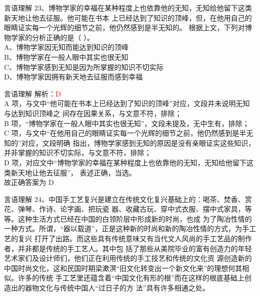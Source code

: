 \documentclass[aspectratio=169]{beamer}
\begin{document}
\begin{frame}[t]{言语理解}
    23、博物学家的幸福在某种程度上也依靠他的无知，无知给他留下这类新天地让他去征服。他可能在书本
    上已经达到了知识的顶峰，但，在他用自己的眼睛证实每一个光辉的细节之前，他仍然感到是半无知的。
    根据上文，下列对博物学家的分析正确的是（ ）。\\
    A、博物学家因无知而能达到知识的顶峰\\
    B、博物学家在一般人眼中其实也很无知\\
    C、博物学家感到无知是因为所掌握的知识不切实际\\
    D、博物学家因拥有新天地去征服而感到幸福\\
\end{frame}




\begin{frame}[t]{言语理解}
    解析：\textcolor{red}{D}\\
    A 项，与文中“他可能在书本上已经达到了知识的顶峰”对应，文段并未说明无知与达到知识顶峰之
    间存在因果关系，与文意不符，排除；\\
    B 项，“博物学家在一般人眼中其实也很无知”，文段未提及，无中生有，排除；\\
    C 项，与文中“在他用自己的眼睛证实每一个光辉的细节之前，他仍然感到是半无知的”对应，文段明确
    指出，博物学家感到无知的原因是没有亲眼证实这些知识，并非掌握的知识不切实际，与文意不符，排除；\\
    D 项，对应文中“博物学家的幸福在某种程度上也依靠他的无知，无知给他留下这类新天地让他去征服”，
    表述正确，当选。\\
    故正确答案为 D\\
\end{frame}




\begin{frame}[t]{言语理解}
    24、中国手工艺复兴是建立在传统文化复兴基础上的：喝茶、焚香、赏花、弹琴、作诗、论字画、把玩瓷
    器、收藏古玩、穿中式衣服、摆中式家具，等等。这种生活方式已经在中国的白领阶层中形成新的时尚，也成
    为了陶冶性情的一种方式。所谓，“器以载道”，正是这种新的时尚和新的陶冶性情的方式，为手工艺的复兴
    打开了出路。而这些具有传统意味又有当代文人风尚的手工艺品的制作者，并非都是传统的手工艺人。其中包
    括了那些从美院毕业的富有创造力的年轻艺术家们及设计师们，他们正在利用传统的手工技艺和传统的文化资
    源创造新的中国时尚文化，这和民国时期梁漱溟“旧文化转变出一个新文化来”的理想何其相似。许多的传统
    手工艺里还蕴含着“中国文化有形的根”而在这样的根底基础上创造出的器物文化与传统中国人“过日子的方
    法”具有许多相通之处。\\
\end{frame}
\end{document}
